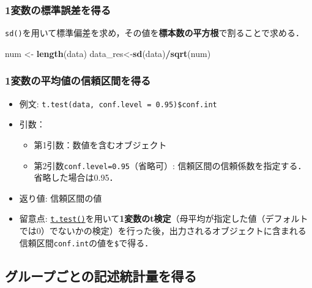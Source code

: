 \documentclass[
  xelatex, ja=standard]{bxjsarticle}
\newenvironment{Shaded}{\begin{snugshade}}{\end{snugshade}}
\newcommand{\FunctionTok}[1]{\textcolor[rgb]{0.13,0.29,0.53}{\textbf{#1}}}
\newcommand{\NormalTok}[1]{#1}
\newcommand{\OtherTok}[1]{\textcolor[rgb]{0.56,0.35,0.01}{#1}}
\newcommand{\SpecialCharTok}[1]{\textcolor[rgb]{0.81,0.36,0.00}{\textbf{#1}}}
\providecommand{\tightlist}{%
  \setlength{\itemsep}{0pt}\setlength{\parskip}{0pt}}
\begin{document}
\subsubsection{\texorpdfstring{1変数の\textbf{標準誤差}を得る}{1変数の標準誤差を得る}}\label{ux5909ux6570ux306eux6a19ux6e96ux8aa4ux5deeux3092ux5f97ux308b}

\texttt{sd()}を用いて標準偏差を求め，その値を\textbf{標本数の平方根}で割ることで求める．

\begin{Shaded}
\begin{Highlighting}[]
\NormalTok{num }\OtherTok{\textless{}{-}} \FunctionTok{length}\NormalTok{(data)}
\NormalTok{data\_res}\OtherTok{\textless{}{-}}\FunctionTok{sd}\NormalTok{(data)}\SpecialCharTok{/}\FunctionTok{sqrt}\NormalTok{(num)}
\end{Highlighting}
\end{Shaded}

\subsubsection{1変数の平均値の信頼区間を得る}\label{ux5909ux6570ux306eux5e73ux5747ux5024ux306eux4fe1ux983cux533aux9593ux3092ux5f97ux308b}

\begin{itemize}
\tightlist
\item
  例文: \texttt{t.test(data,\ conf.level\ =\ 0.95)\$conf.int}
\item
  引数：

  \begin{itemize}
  \tightlist
  \item
    第1引数：数値を含むオブジェクト
  \item
    第2引数\texttt{conf.level=0.95}（省略可）:
    信頼区間の信頼係数を指定する．省略した場合は0.95．
  \end{itemize}
\item
  返り値: 信頼区間の値
\item
  留意点:
  \hyperref[2ux7fa4ux3067ux5e73ux5747ux5024ux3092ux6bd4ux8f03ux3057ux305fux3044]{\texttt{t.test()}}を用いて\textbf{1変数のt検定}（母平均が指定した値（デフォルトでは0）でないかの検定）を行った後，出力されるオブジェクトに含まれる信頼区間\texttt{conf.int}の値を\texttt{\$}で得る．
\end{itemize}

\subsection{グループごとの記述統計量を得る}\label{ux30b0ux30ebux30fcux30d7ux3054ux3068ux306eux8a18ux8ff0ux7d71ux8a08ux91cfux3092ux5f97ux308b}
\end{document}
